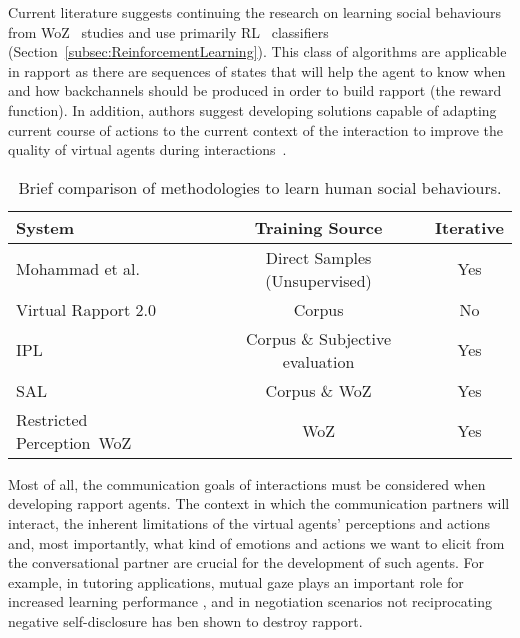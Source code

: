 Current literature suggests continuing the research on learning social behaviours from \ac{WoZ}~\cite{Sequeira2016, Knox2014, Papangelis2014} studies and use primarily \ac{RL}~\cite{Thomaz2006, Kok2012, Zhao2014, Papangelis2014} classifiers (Section~\ref{subsec:ReinforcementLearning}). This class of algorithms are applicable in rapport as there are sequences of states that will help the agent to know when and how backchannels should be produced in order to build rapport (the reward function). In addition, authors suggest developing solutions capable of adapting current course of actions to the current context of the interaction to improve the quality of virtual agents during interactions~\cite{Kopp2007, Zwiers2011, Reidsma2011, Visser2014}.

\begin{table}[]
	\centering
	\begin{tabular}{|l|c|c|}
		\hline
		\textbf{System}              	& \textbf{Training Source} 	& \textbf{Iterative} \\ \hline
		Mohammad et al.~\cite{Mohammad2010} & Direct Samples (Unsupervised) & Yes \\ \hline
		Virtual Rapport 2.0~\cite{Buschmeier2011} 			& Corpus			& No \\ \hline
		\acf{IPL}~\cite{Kok2012}          				& Corpus \& Subjective evaluation			& Yes \\ \hline
		\acf{SAL}~\cite{Schroder2012} & Corpus \& \ac{WoZ}		& Yes \\ \hline
		Restricted Perception~\ac{WoZ}~\cite{Sequeira2016}  & \ac{WoZ}		& Yes \\ \hline
		
	\end{tabular}
	\caption{Brief comparison of methodologies to learn human social behaviours.}
	\label{fig:comparison:vh:systems}
\end{table}

Most of all, the communication goals of interactions must be considered when developing rapport agents. The context in which the communication partners will interact, the inherent limitations of the virtual agents' perceptions and actions and, most importantly, what kind of emotions and actions we want to elicit from the conversational partner are crucial for the development of such agents. For example, in tutoring applications, mutual gaze plays an important role for increased learning performance \cite{OTTESON1980, SHERWOOD1987, Fry1975}, and in negotiation scenarios not reciprocating negative self-disclosure has ben shown to destroy rapport\cite{Bronstein2012}.

